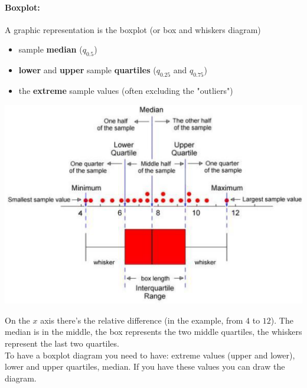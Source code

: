 \documentclass[11pt]{article}
\begin{document}
	\paragraph{Boxplot:} A graphic representation is the boxplot (or box and whiskers diagram)
	\begin{itemize}
		\item sample \textbf{median} ($q_{0.5}$)
		\item \textbf{lower} and \textbf{upper} sample \textbf{quartiles} ($q_{0.25}$ and $q_{0.75}$)
		\item the \textbf{extreme} sample values (often excluding the "outliers")
	\end{itemize}
	\begin{center}
		\includegraphics[width=0.9\columnwidth]{img/boxplot1}
	\end{center}
	On the $x$ axis there's the relative difference (in the example, from $4$ to $12$). The median is in the middle, the box represents the two middle quartiles, the whiskers represent the last two quartiles.\\
	
	To have a boxplot diagram you need to have: extreme values (upper and lower), lower and upper quartiles, median. If you have these values you can draw the diagram.\\
	
	\newpage
	
\end{document}
